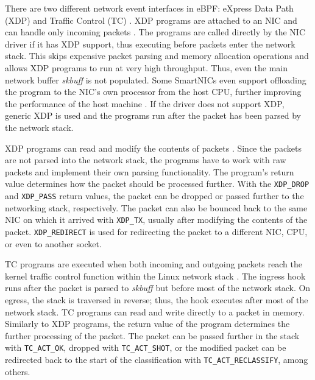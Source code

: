 \documentclass[english, 12pt, a4paper, sci, utf8, a-2b, online]{aaltothesis}
\newcommand{\mycomment}[3]{\textcolor{#1}{#2:~#3}}
\newcommand{\jb}[1]{\noindent\mycomment{aaltoRed}{JB}{#1}}
\begin{document}
There are two different network event interfaces in eBPF: eXpress Data Path (XDP) and Traffic Control (TC) \cite{miano2021framework}.
XDP programs are attached to an NIC and can handle only incoming packets \cite{hoiland2018express}.
The programs are called directly by the NIC driver if it has XDP support, thus executing before packets enter the network stack.
This skips expensive packet parsing and memory allocation operations and allows XDP programs to run at very high throughput.
Thus, even the main network buffer \emph{skbuff} is not populated.
Some SmartNICs even support offloading the program to the NIC's own processor from the host CPU, further improving the performance of the host machine \cite{cilium-program-types}.
If the driver does not support XDP, generic XDP is used and the programs run after the packet has been parsed by the network stack.

XDP programs can read and modify the contents of packets \cite{vieira2020fast}.
Since the packets are not parsed into the network stack, the programs have to work with raw packets and implement their own parsing functionality.
The program's return value determines how the packet should be processed further.
With the \lstinline{XDP_DROP} and \lstinline{XDP_PASS} return values, the packet can be dropped or passed further to the networking stack, respectively.
The packet can also be bounced back to the same NIC on which it arrived with \lstinline{XDP_TX}, usually after modifying the contents of the packet.
\lstinline{XDP_REDIRECT} is used for redirecting the packet to a different NIC, CPU, or even to another socket.

TC programs are executed when both incoming and outgoing packets reach the kernel traffic control function within the Linux network stack \cite{vieira2020fast}.
The ingress hook runs after the packet is parsed to \emph{skbuff} but before most of the network stack.
On egress, the stack is traversed in reverse; thus, the hook executes after most of the network stack.
TC programs can read and write directly to a packet in memory.
Similarly to XDP programs, the return value of the program determines the further processing of the packet.
The packet can be passed further in the stack with \lstinline{TC_ACT_OK}, dropped with \lstinline{TC_ACT_SHOT}, or the modified packet can be redirected back to the start of the classification with \lstinline{TC_ACT_RECLASSIFY}, among others.

\clearpage
\end{document}
